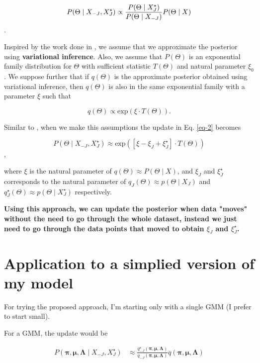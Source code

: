 \documentclass{article}
\begin{document}
\begin{equation}
\label{eq-2}
P(\Theta \mid X_{-J}, X_{J}^{\star}) \propto 
\frac{P(\Theta \mid X_{J}^{\star})}{P(\Theta \mid X_{-J})}P(\Theta \mid X) \\
\end{equation}.

Inspired by the work done in \cite{streaming-variational-bayes}, we assume 
that we approximate the posterior using \textbf{variational inference}. Also,
we assume that $P(\Theta)$ is an exponential family distribution for $\Theta$
with sufficient statistic $T(\Theta)$ and natural parameter $\xi_0$. We suppose
further that if $q(\Theta)$ is the approximate posterior obtained using
variational inference, then $q(\Theta)$ is also in the same exponential family
with a parameter $\xi$ such that

\begin{equation}
\label{exponential-family}
q(\Theta) \propto \text{exp}(\xi \cdot T(\Theta)).
\end{equation}

Similar to \cite{streaming-variational-bayes}, when we make this assumptions
the update in Eq. \ref{eq-2} becomes

\begin{equation}
P(\Theta \mid X_{-J}, X_{J}^{\star}) \approx 
\text{exp}([\xi - \xi_{J} + \xi_{J}^{\star}] \cdot T(\Theta))
\end{equation},

where $\xi$ is the natural parameter of $q(\Theta) \approx P(\Theta \mid X)$,
and $\xi_{J}$ and $\xi_{J}^{\star}$ corresponds to the natural parameter of 
$q_{J}(\Theta) \approx p(\Theta \mid X_{J})$ and 
$q_{J}^{\star}(\Theta) \approx p(\Theta \mid X_{J}^{\star})$ respectively.

\textbf{Using this approach, we can update the posterior when data "moves" 
without the need to go through the whole dataset, instead we just need to go 
through the data points that moved to obtain $\xi_{J}$ and $\xi_{J}^{\star}$.}

\section{Application to a simplied version of my model}
For trying the proposed approach, I'm starting only with a single GMM (I prefer
to start small).

For a GMM, the update would be

\begin{align}
P(\boldsymbol{\pi}, \boldsymbol{\mu}, \boldsymbol{\Lambda} 
    \mid X_{-J}, X_J^{\star}) 
&\approx \frac{q_{-J}^{\star}(\boldsymbol{\pi}, \boldsymbol{\mu}, 
    \boldsymbol{\Lambda})}
    {q_{-J}(\boldsymbol{\pi}, \boldsymbol{\mu}, \boldsymbol{\Lambda})}
    q(\boldsymbol{\pi}, \boldsymbol{\mu}, \boldsymbol{\Lambda}) \\
\end{align}
\end{document}
